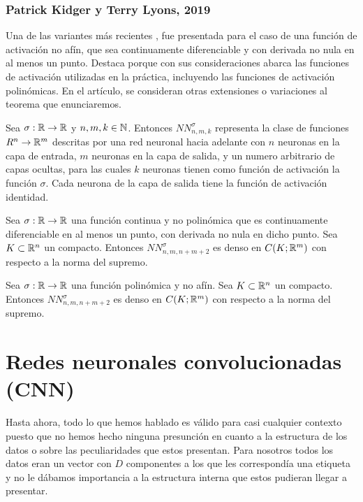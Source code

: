 \subsection{Patrick Kidger y Terry Lyons, 2019}
Una de las variantes más recientes \cite{2019arXiv190508539K}, fue presentada para el caso de una función de activación no afín, que sea continuamente diferenciable y con derivada no nula en al menos un punto. Destaca porque con sus consideraciones abarca las funciones de activación utilizadas en la práctica, incluyendo las funciones de activación polinómicas. En el artículo, se consideran otras extensiones o variaciones al teorema que enunciaremos.\\

\begin{definicion}
Sea $\sigma:\mathbb{R}\to\mathbb{R}$ y $n,m,k\in\mathbb{N}$. Entonces $NN_{n,m,k}^\sigma$ representa la clase de funciones $R^n\to \mathbb{R}^m$ descritas por una red neuronal hacia adelante con $n$ neuronas en la capa de entrada, $m$ neuronas en la capa de salida, y un numero arbitrario de capas ocultas, para las cuales $k$ neuronas tienen como función de activación la función $\sigma$. Cada neurona de la capa de salida tiene la función de activación identidad.
\end{definicion}

\begin{teorema}
Sea $\sigma : \mathbb{R} \to \mathbb{R}$ una función continua y no polinómica que es continuamente diferenciable en al menos un punto, con derivada no nula en dicho punto. Sea $K \subset \mathbb{R}^n$ un compacto. Entonces $NN_{n,m,n+m+2}^\sigma$ es denso en $C(K;\mathbb{R}^m)$ con respecto a la norma del supremo.
\end{teorema}

\begin{teorema}
Sea $\sigma : \mathbb{R} \to \mathbb{R}$ una función polinómica y no afín. Sea $K \subset \mathbb{R}^n$ un compacto. Entonces $NN_{n,m,n+m+2}^\sigma$ es denso en $C(K;\mathbb{R}^m)$ con respecto a la norma del supremo.
\end{teorema}

\chapter{Redes neuronales convolucionadas (CNN)}

Hasta ahora, todo lo que hemos hablado es válido para casi cualquier contexto puesto que no hemos hecho ninguna presunción en cuanto a la estructura de los datos o sobre las peculiaridades que estos presentan. Para nosotros todos los datos eran un vector con $D$ componentes a los que les correspondía una etiqueta y no le dábamos importancia a la estructura interna que estos pudieran llegar a presentar.\\


